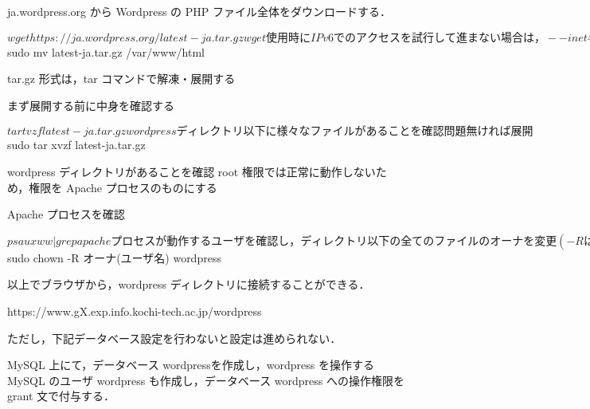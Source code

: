 \begin{cli}
ja.wordpress.org から Wordpress の PHP ファイル全体をダウンロードする．

$ wget https://ja.wordpress.org/latest-ja.tar.gz

  wget 使用時に IPv6 でのアクセスを試行して進まない場合は，
  --inet4-only オプションを付与して実行することで IPv4 での
  転送を強制させるとよい

ファイルをWWW公開ディレクトリに移動する

$ sudo mv latest-ja.tar.gz /var/www/html

  tar.gz 形式は，tar コマンドで解凍・展開する

まず展開する前に中身を確認する

$ tar tvzf latest-ja.tar.gz

  wordpress ディレクトリ以下に様々なファイルがあることを確認
  問題無ければ展開

$ sudo tar xvzf latest-ja.tar.gz

  wordpress ディレクトリがあることを確認
  root 権限では正常に動作しないため，権限を Apache プロセスのものにする

Apache プロセスを確認

$ ps auxww | grep apache

  プロセスが動作するユーザを確認し，ディレクトリ以下の全てのファイルの
  オーナを変更(-R は recursive 再帰的に全てのファイルを変更)

$ sudo chown -R オーナ(ユーザ名) wordpress
\end{cli}

以上でブラウザから，wordpress ディレクトリに接続することができる．

\begin{cli}
https://www.gX.exp.info.kochi-tech.ac.jp/wordpress
\end{cli}

ただし，下記データベース設定を行わないと設定は進められない．
%

MySQL 上にて，データベース wordpressを作成し，wordpress を操作する MySQL 
のユーザ wordpress も作成し，データベース wordpress への操作権限を grant 
文で付与する．


